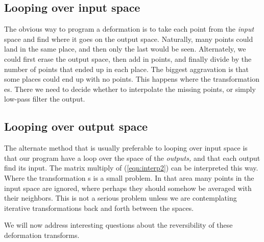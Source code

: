 \subsection{Looping over input space}
The obvious way to program a deformation
is to take each point from the {\em  input} space
and find where it goes on the output space.
Naturally, many points could land in the same place,
and then only the last would be seen.
Alternately, we could first erase the output space,
then add in points, and finally divide by the number of points
that ended up in each place.
The biggest aggravation is that some places could end up with no points.
This happens where the transformation es.
There we need to decide whether to interpolate the missing points,
or simply low-pass filter the output.

\subsection{Looping over output space}
The alternate method that is usually preferable
to looping over input space
is that
our program have a loop over the space of the {\em  outputs,}
and that each output find its input.
The matrix multiply of (\ref{eqn:interp2})
can be interpreted this way.
Where the transformation s is a small problem.
In that area
many points in the input space are ignored,
where perhaps they should somehow be averaged with their neighbors.
This is not a serious problem unless we are contemplating
iterative transformations back and forth between the spaces.

\par
We will now address interesting questions
about
the reversibility of these deformation transforms.

